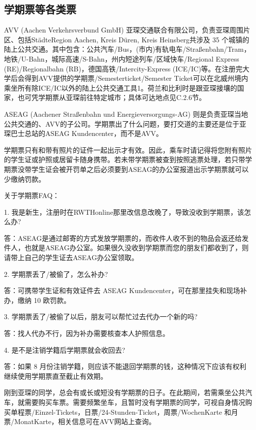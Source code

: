   \subsection{学期票等各类票}\label{subsec:学期票等各类票}

    AVV (Aachen Verkehrsverbund GmbH) 亚琛交通联合有限公司，负责亚琛周围片区、包括StädteRegion Aachen, Kreis Düren, Kreis Heinsberg共涉及 35 个城镇的陆上公共交通。其中包含：公共汽车/Bus，(市内)有轨电车/Straßenbahn/Tram，地铁/U-Bahn，城际高速/S-Bahn，州内短途列车/区域快车/Regional Express (RE)/Regionalbahn (RB)，德国高铁/Intercity-Express (ICE/IC)等。在注册完大学后会得到AVV提供的学期票/Semesterticket/Semester Ticket可以在北威州境内乘坐所有除ICE/IC以外的陆上公共交通工具1。荷兰和比利时是跟亚琛接壤的国家，也可凭学期票从亚琛前往特定城市；具体可达地点见C.2.6节。

    ASEAG (Aachener Straßenbahn und Energieversorgungs-AG) 则是负责亚琛当地公共交通的、AVV的子公司。学期票出了什么问题，要打交道的主要还是位于亚琛巴士总站的ASEAG Kundencenter，而不是AVV。

    学期票只有和带有照片的证件一起出示才有效。因此，乘车时请记得将您附有照片的学生证或护照或居留卡随身携带。若未带学期票被查到按照逃票处理，若只带学期票没带学生证会被开罚单之后必须要到ASEAG的办公室报道出示学期票就可以少缴纳罚款。

    关于学期票FAQ：

    1. 我是新生，注册时在RWTHonline那里改信息改晚了，导致没收到学期票，该怎么办?

    答：ASEAG是通过邮寄的方式发放学期票的，而收件人收不到的物品会返还给发件人，也就是ASEAG办公室。如果很久没收到学期票而您的朋友们都收到了，则请带上自己的学生证去ASEAG办公室领取。

    2. 学期票丢了/被偷了，怎么补办?

    答：可携带学生证和有效证件去 ASEAG Kundencenter，可在那里挂失和现场补办，缴纳 10 欧罚款。

    3. 学期票丢了/被偷了以后，朋友可以帮忙过去代办一个新的吗?

    答：找人代办不行，因为补办需要核查本人护照信息。

    4. 是不是注销学籍后学期票就会收回去?

    答：如果 8 月份注销学籍，则应该不能退回学期票的钱，这种情况下应该有权利继续使用学期票直至截止有效期。

    刚到亚琛的同学，总会有或长或短没有学期票的日子。在此期间，若需乘坐公共汽车，就需要购买车票。需要频繁坐车，且暂时没有学期票的同学，可视自身情况购买单程票/Einzel-Tickets，日票/24-Stunden-Ticket，周票/WochenKarte 和月票/MonatKarte，相关信息可在AVV网站上查询。

